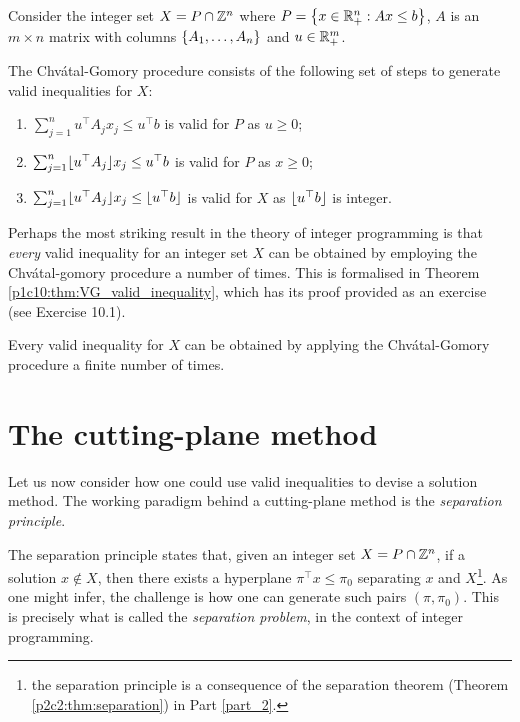 \begin{definition} \label{p1c10:def:CG-procedure}
	Consider the integer set $X = P \cap \mathbb{Z}^n$ where \lb $P = \left\{ x \in \mathbb{R}^n_+ : Ax \leq b \right \}$, $A$ is an $m \times n$ matrix with columns $\left\{ A_1, \dots, A_n \right \}$ and $u \in \mathbb{R}^m_+$.
	
	The Chv\'atal-Gomory procedure consists of the following set of steps to generate valid inequalities for $X$:
	\begin{enumerate}
	    \item $\sum_{j=1}^n u^\top A_jx_j \leq u^\top b$ is valid for $P$ as $u\geq 0$;
	    \item $\sum_{j=1}^n \lfloor u^\top A_j \rfloor x_j \leq u^\top b$ is valid for $P$ as $x \geq 0$;
	    \item $\sum_{j=1}^n  \lfloor u^\top A_j \rfloor x_j \leq \lfloor u^\top b \rfloor$ is valid for $X$ as $\lfloor u^\top b \rfloor$ is integer.
	\end{enumerate}		
\end{definition}
	
Perhaps the most striking result in the theory of integer programming is that \emph{every} valid inequality for an integer set $X$ can be obtained by employing the Chv\'atal-gomory procedure a number of times. This is formalised in Theorem \ref{p1c10:thm:VG_valid_inequality}, which has its proof provided as an exercise (see Exercise 10.1).

\begin{theorem} \label{p1c10:thm:VG_valid_inequality}
	Every valid inequality for $X$ can be obtained by applying the Chv\'atal-Gomory procedure a finite number of times.
\end{theorem}
	
	
\section{The cutting-plane method}


Let us now consider how one could use valid inequalities to devise a solution method. The working paradigm behind a cutting-plane method is the \emph{separation principle}. 

The separation principle states that, given an integer set $X = P \cap \mathbb{Z}^n$, if a solution $x \notin X$, then there exists a hyperplane $\pi^\top x \leq \pi_0$ separating $x$ and $X$\footnote{the separation principle is a consequence of the separation theorem (Theorem \ref{p2c2:thm:separation}) in Part \ref{part_2}.}. As one might infer, the challenge is how one can generate such pairs $(\pi, \pi_0)$. This is precisely what is called the \emph{separation problem}, in the context of integer programming.


